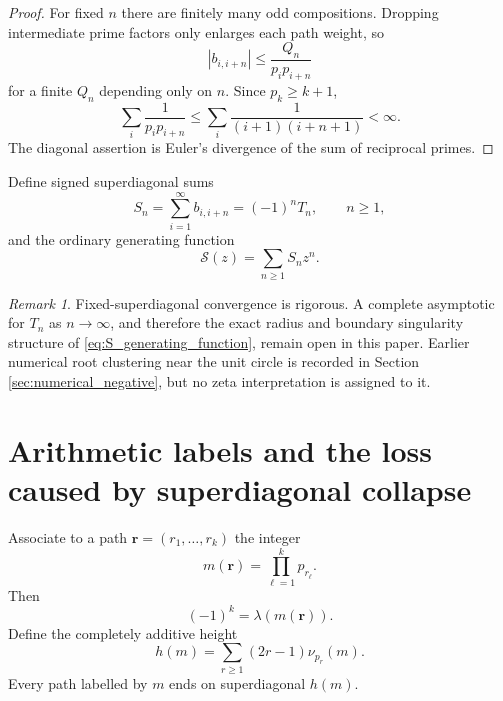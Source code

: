 \documentclass[11pt]{amsart}
\numberwithin{equation}{section}
\theoremstyle{plain}
\theoremstyle{definition}
\theoremstyle{remark}
\newtheorem{remark}[theorem]{Remark}
\begin{document}
\begin{proof}
For fixed $n$ there are finitely many odd compositions.  Dropping intermediate prime factors only enlarges each path weight, so
\begin{equation}
|b_{i,i+n}|\le \frac{Q_n}{p_ip_{i+n}}
\label{eq:path_Q_bound}
\end{equation}
for a finite $Q_n$ depending only on $n$.  Since $p_k\ge k+1$,
\begin{equation}
\sum_i\frac1{p_ip_{i+n}}
\le
\sum_i\frac1{(i+1)(i+n+1)}<\infty.
\label{eq:superdiag_comparison}
\end{equation}
The diagonal assertion is Euler's divergence of the sum of reciprocal primes.
\end{proof}

Define signed superdiagonal sums
\begin{equation}
S_n=\sum_{i=1}^{\infty}b_{i,i+n}=(-1)^nT_n,
\qquad n\ge1,
\label{eq:Sn_definition}
\end{equation}
and the ordinary generating function
\begin{equation}
\mathcal S(z)=\sum_{n\ge1}S_nz^n.
\label{eq:S_generating_function}
\end{equation}

\begin{remark}
\label{rem:unit_circle_status}
Fixed-superdiagonal convergence is rigorous.  A complete asymptotic for $T_n$ as $n\to\infty$, and therefore the exact radius and boundary singularity structure of \eqref{eq:S_generating_function}, remain open in this paper.  Earlier numerical root clustering near the unit circle is recorded in Section \ref{sec:numerical_negative}, but no zeta interpretation is assigned to it.
\end{remark}

\section{Arithmetic labels and the loss caused by superdiagonal collapse}
\label{sec:arithmetic_labels}

Associate to a path $\mathbf r=(r_1,\ldots,r_k)$ the integer
\begin{equation}
m(\mathbf r)=\prod_{\ell=1}^k p_{r_\ell}.
\label{eq:path_integer_label}
\end{equation}
Then
\begin{equation}
(-1)^k=\lambda(m(\mathbf r)).
\label{eq:path_liouville_sign}
\end{equation}
Define the completely additive height
\begin{equation}
h(m)=\sum_{r\ge1}(2r-1)\nu_{p_r}(m).
\label{eq:h_definition}
\end{equation}
Every path labelled by $m$ ends on superdiagonal $h(m)$.
\end{document}
